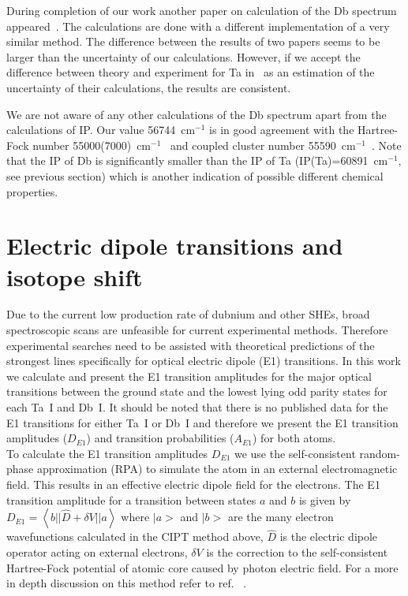 \documentclass[10pt,a4paper, twoside, openright]{report}
\begin{document}
During completion of our work another paper on calculation of the Db spectrum appeared~\cite{Geddes2018}.
The calculations are done with a different implementation of a very similar method. The difference between the results 
of two papers seems to be larger than the uncertainty of our calculations. However, if we accept the difference between 
theory and experiment for Ta in~\cite{Geddes2018} as an estimation of the uncertainty of their calculations, the results
are consistent.

We are not aware of any other calculations of the Db spectrum apart from the calculations of IP. Our value 56744~cm$^{-1}$ is in good agreement with the Hartree-Fock number 55000(7000)~cm$^{-1}$~\cite{Dzuba2016} and
coupled cluster number 55590~cm$^{-1}$~\cite{BorschevskyPC}. Note that the IP of Db is significantly smaller than the IP
of Ta (IP(Ta)=60891~cm$^{-1}$, see previous section) which is another indication of possible different chemical properties. 

\section{Electric dipole transitions and isotope shift} \label{sec:E1transitions}

Due to the current low production rate of dubnium and other SHEs, broad spectroscopic scans are unfeasible for current experimental methods. Therefore experimental searches need to be assisted with theoretical predictions of the strongest lines specifically for optical electric dipole (E1) transitions. In this work we calculate and present the E1 transition amplitudes for the major optical  transitions between the ground state and the  lowest lying odd parity states for each Ta~I and Db~I. It should be noted that there is no published data for the E1 transitions for either Ta~I or Db~I and therefore we present the E1 transition amplitudes ($D_{E1}$)  and transition probabilities ($A_{E1}$) for both atoms. \\

To calculate the E1 transition amplitudes $D_{E1}$ we use the self-consistent random-phase approximation (RPA) to simulate the atom in an external electromagnetic field. This results in an effective electric dipole field for the electrons. The E1 transition amplitude for a transition between states $a$ and $b$ is given by $D_{E1} = \left< b || \hat D + \delta V || a\right>$ where $|a>$ and $|b>$ are the many electron wavefunctions calculated in the CIPT method above, $\hat D$ is the electric dipole operator acting on external electrons, $\delta V$ is the correction to the self-consistent Hartree-Fock potential of atomic core caused by photon electric field. For a more in depth discussion on this method refer to ref. ~\cite{Dzuba2018}. \\
\end{document}
